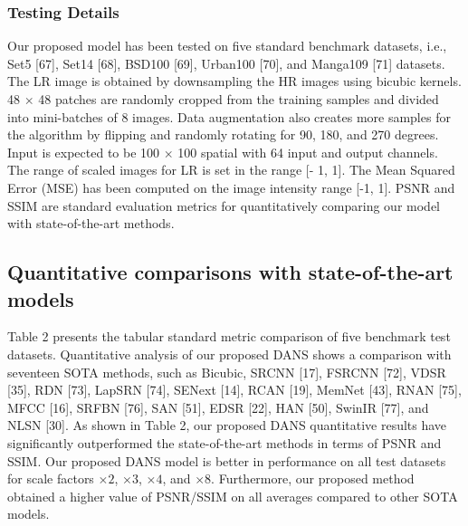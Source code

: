 \documentclass{ieeeaccess}
\begin{document}
\subsubsection{Testing Details} 

Our proposed model has been tested on five standard benchmark datasets, i.e., Set5 [67], Set14 [68], BSD100 [69], Urban100 [70], and Manga109 [71] datasets. The LR image is obtained by downsampling the HR images using bicubic kernels. 48 $\times$ 48 patches are randomly cropped from the training samples and divided into mini-batches of 8 images. Data augmentation also creates more samples for the algorithm by flipping and randomly rotating for 90, 180, and 270 degrees. Input is expected to be 100 $\times$ 100 spatial with 64 input and output channels. The range of scaled images for LR is set in the range [- 1, 1]. The Mean Squared Error (MSE) has been computed on the image intensity range [-1, 1]. PSNR and SSIM are standard evaluation metrics for quantitatively comparing our model with state-of-the-art methods.


\subsection{Quantitative comparisons with state-of-the-art models}
Table 2 presents the tabular standard metric comparison of five benchmark test datasets. Quantitative analysis of our proposed DANS shows a comparison with seventeen SOTA methods, such as Bicubic, SRCNN [17], FSRCNN [72], VDSR [35], RDN [73], LapSRN [74], SENext [14], RCAN [19], MemNet [43], RNAN [75], MFCC [16], SRFBN [76], SAN [51], EDSR [22], HAN [50], SwinIR [77], and NLSN [30]. 
As shown in Table 2, our proposed DANS quantitative results have significantly outperformed the state-of-the-art methods in terms of PSNR and SSIM. Our proposed DANS model is better in performance on all test datasets for scale factors $\times2$, $\times3$, $\times4$, and $\times8$. Furthermore, our proposed method obtained a higher value of PSNR/SSIM on all averages compared to other SOTA models.
\end{document}
